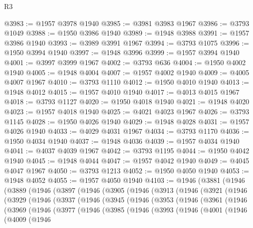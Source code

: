 \begin{lexlean}{R3}
\begin{coremodule}
@3983 := @1957 @3978 @1940
@3985 := @3981 @3983 @1967
@3986 := @3793 @1049
@3988 := @1950 @3986 @1940
@3989 := @1948 @3988
@3991 := @1957 @3986 @1940
@3993 := @3989 @3991 @1967
@3994 := @3793 @1075
@3996 := @1950 @3994 @1940
@3997 := @1948 @3996
@3999 := @1957 @3994 @1940
@4001 := @3997 @3999 @1967
@4002 := @3793 @636
@4004 := @1950 @4002 @1940
@4005 := @1948 @4004
@4007 := @1957 @4002 @1940
@4009 := @4005 @4007 @1967
@4010 := @3793 @1110
@4012 := @1950 @4010 @1940
@4013 := @1948 @4012
@4015 := @1957 @4010 @1940
@4017 := @4013 @4015 @1967
@4018 := @3793 @1127
@4020 := @1950 @4018 @1940
@4021 := @1948 @4020
@4023 := @1957 @4018 @1940
@4025 := @4021 @4023 @1967
@4026 := @3793 @1145
@4028 := @1950 @4026 @1940
@4029 := @1948 @4028
@4031 := @1957 @4026 @1940
@4033 := @4029 @4031 @1967
@4034 := @3793 @1170
@4036 := @1950 @4034 @1940
@4037 := @1948 @4036
@4039 := @1957 @4034 @1940
@4041 := @4037 @4039 @1967
@4042 := @3793 @1195
@4044 := @1950 @4042 @1940
@4045 := @1948 @4044
@4047 := @1957 @4042 @1940
@4049 := @4045 @4047 @1967
@4050 := @3793 @1213
@4052 := @1950 @4050 @1940
@4053 := @1948 @4052
@4055 := @1957 @4050 @1940
@4103 := @1946
    (@3881
      (@1946
        (@3889
          (@1946
            (@3897
              (@1946
                (@3905
                  (@1946
                    (@3913
                      (@1946
                        (@3921
                          (@1946
                            (@3929
                              (@1946
                                (@3937
                                  (@1946
                                    (@3945
                                      (@1946
                                        (@3953
                                          (@1946
                                            (@3961
                                              (@1946
                                                (@3969
                                                  (@1946
                                                    (@3977
                                                      (@1946
                                                        (@3985
                                                          (@1946
                                                            (@3993
                                                              (@1946
                                                                (@4001
                                                                  (@1946
                                                                    (@4009
                                                                      (@1946

\end{coremodule}
\end{lexlean}
